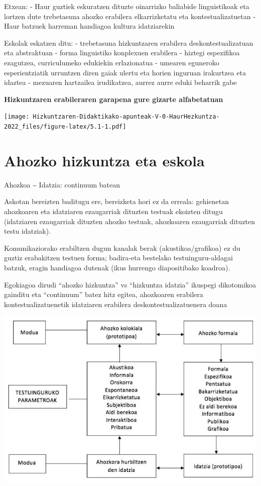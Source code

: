 \documentclass[
]{book}
\begin{document}
Etxean:
- Haur guztiek eskuratzen dituzte oinarrizko baliabide linguistikoak eta lortzen dute trebetasuna ahozko erabilera elkarrizketatu eta kontestualizatuetan
- Haur batzuek harreman handiagoa kultura idatziarekin

Eskolak eskatzen ditu:
- trebetasuna hizkuntzaren erabilera deskontestualizatuan eta abstraktuan
- forma linguistiko konplexuen erabilera
- hiztegi espezifikoa ezagutzea, curriculumeko edukiekin erlazionatua
- umearen eguneroko esperientziatik urruntzen diren gaiak ulertu eta horien inguruan irakurtzea eta idaztea
- mezuaren hartzailea irudikatzea, aurrez aurre eduki beharrik gabe

\textbf{Hizkuntzaren erabileraren garapena gure gizarte alfabetatuan}

\texttt{[image: Hizkuntzaren-Didaktikako-apunteak-V-0-HaurHezkuntza-2022\_files/figure-latex/5.1-1.pdf]}

\hypertarget{ahozko-hizkuntza-eta-eskola}{%
\section{Ahozko hizkuntza eta eskola}\label{ahozko-hizkuntza-eta-eskola}}

Ahozkoa \textasciitilde{} Idatzia: continuum batean

Askotan bereizten baditugu ere, bereizketa hori ez da erreala: gehienetan ahozkoaren eta idatziaren ezaugarriak dituzten testuak ekoizten ditugu (idatziaren ezaugarriak dituzten ahozko testuak, ahozkoaren ezaugarriak dituzten testu idatziak).

Komunikaziorako erabiltzen dugun kanalak berak (akustikoa/grafikoa) ez du guztiz erabakitzen testuen forma; badira-eta bestelako testuinguru-aldagai batzuk, eragin handiagoa dutenak (ikus hurrengo diapositibako koadroa).

Egokiagoa dirudi ``ahozko hizkuntza'' vs ``hizkuntza idatzia'' ikuspegi dikotomikoa gainditu eta ``continuum'' batez hitz egitea, ahozkoaren erabilera kontestualizatuenetik idatziaren erabilera deskontestualizatuenera doana

\includegraphics{assets/5-2.png}
\end{document}
